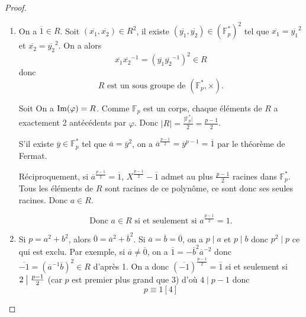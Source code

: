 \begin{proof}
	\phantom{}
	\begin{enumerate}
		\item On a $\overline{1}\in R$. Soit $(\overline{x_{1}},\overline{x_{2}})\in R^{2}$, il existe $(\overline{y_{1}},\overline{y_{2}})\in(\mathbb{F}_{p}^{*})^{2}$ tel que $\overline{x_{1}}=\overline{y_{1}}^{2}$ et $\overline{x_{2}}=\overline{y_{2}}^{2}$. On a  alors 
		\begin{equation}
			\overline{x_{1}}\overline{x_{2}}^{-1}=(\overline{y_{1}}\overline{y_{2}}^{-1})^{2}\in R
		\end{equation}
		donc 
		\begin{equation}
			\boxed{R\text{ est un sous groupe de }(\mathbb{F}_{p}^{*},\times).}
		\end{equation}
		
		Soit 
		On a $\mathrm{Im}(\varphi)=R$. Comme $\mathbb{F}_{p}$ est un corps, chaque éléments de $R$ a exactement 2 antécédents par $\varphi$. Donc $\vert R\vert=\frac{\vert\mathbb{F}_{p}^{*}\vert}{2}=\frac{p-1}{2}$.

		S'il existe $\overline{y}\in\mathbb{F}_{p}^{*}$ tel que $\overline{a}=\overline{y}^{2}$, on a $\overline{a}^{\frac{p-1}{2}}=\overline{y}^{p-1}=\overline{1}$ par le théorème de Fermat.

		Réciproquement, si $\overline{a}^{\frac{p-1}{2}}=\overline{1}$, $X^{\frac{p-1}{2}}-\overline{1}$ admet au plus $\frac{p-1}{2}$ racines dans $\mathbb{F}_{p}^{*}$. Tous les éléments de $R$ sont racines de ce polynôme, ce sont donc ses seules racines. Donc $a\in R$.

		\begin{equation}
			\boxed{\text{Donc }a\in R\text{ si et seulement si }a^{\frac{p-1}{2}}=1.}
		\end{equation}

		\item Si $p=a^{2}+b^{2}$, alors $\overline{0}=\overline{a}^{2}+\overline{b}^{2}$. Si $\overline{a}=\overline{b}=\overline{0}$, on a $p\mid a$ et $p\mid b$ donc $p^{2}\mid p$ ce qui est exclu. Par exemple, si $\overline{a}\neq\overline{0}$, on a $\overline{1}=-\overline{b}^{2}\overline{a}^{-2}$ donc $\overline{-1}=(\overline{a}^{-1}\overline{b})^{2}\in R$ d'après 1. On a donc $(\overline{-1})^{\frac{p-1}{2}}=\overline{1}$ si et seulement si $2\bigm|\frac{p-1}{2}$ (car $p$ est premier plus grand que 3) d'où $4\mid p-1$ donc 
		\begin{equation}
			\boxed{p\equiv 1[4]}
		\end{equation}
		

\end{enumerate}
\end{proof}

